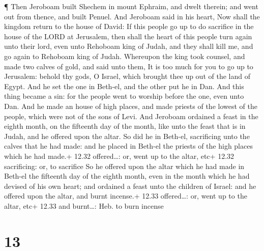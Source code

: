  ¶ Then Jeroboam built Shechem in mount Ephraim, and dwelt
therein; and went out from thence, and built Penuel.  And
Jeroboam said in his heart, Now shall the kingdom return to the house of
David:  If this people go up to do sacrifice in the house
of the LORD at Jerusalem, then shall the heart of this people turn again
unto their lord, even unto Rehoboam king of Judah, and they shall kill
me, and go again to Rehoboam king of Judah.  Whereupon the
king took counsel, and made two calves of gold, and said unto them, It
is too much for you to go up to Jerusalem: behold thy gods, O Israel,
which brought thee up out of the land of Egypt.  And he set
the one in Beth-el, and the other put he in Dan.  And this
thing became a sin: for the people went to worship before the one, even
unto Dan.  And he made an house of high places, and made
priests of the lowest of the people, which were not of the sons of Levi.
 And Jeroboam ordained a feast in the eighth month, on the
fifteenth day of the month, like unto the feast that is in Judah, and he
offered upon the altar. So did he in Beth-el, sacrificing unto the
calves that he had made: and he placed in Beth-el the priests of the
high places which he had made.+ 12.32 offered\ldots: or, went up to the
altar, etc+ 12.32 sacrificing: or, to sacrifice  So he
offered upon the altar which he had made in Beth-el the fifteenth day of
the eighth month, even in the month which he had devised of his own
heart; and ordained a feast unto the children of Israel: and he offered
upon the altar, and burnt incense.+ 12.33 offered\ldots: or, went up to
the altar, etc+ 12.33 and burnt\ldots: Heb. to burn incense

\hypertarget{section-12}{%
\section{13}\label{section-12}}


